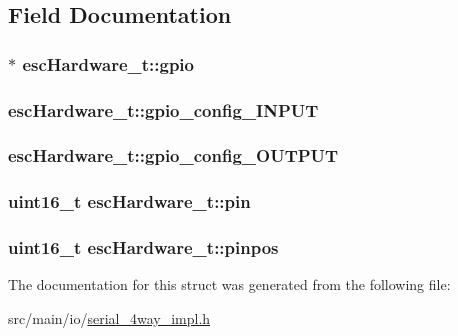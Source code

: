 \subsection{Field Documentation}
\hypertarget{structescHardware__t_af1e2d02487b679ff58901f36db0d97d9}{
\subsubsection[{gpio}]{$\ast$ esc\+Hardware\+\_\+t\+::gpio}}\label{structescHardware__t_af1e2d02487b679ff58901f36db0d97d9}
\hypertarget{structescHardware__t_a903bb73901dddb9f5730579006e74772}{
\subsubsection[{gpio\+\_\+config\+\_\+\+I\+N\+P\+U\+T}]{ esc\+Hardware\+\_\+t\+::gpio\+\_\+config\+\_\+\+I\+N\+P\+U\+T}}\label{structescHardware__t_a903bb73901dddb9f5730579006e74772}
\hypertarget{structescHardware__t_afe34748d0d5940a9b76a64cbde96a2d5}{
\subsubsection[{gpio\+\_\+config\+\_\+\+O\+U\+T\+P\+U\+T}]{ esc\+Hardware\+\_\+t\+::gpio\+\_\+config\+\_\+\+O\+U\+T\+P\+U\+T}}\label{structescHardware__t_afe34748d0d5940a9b76a64cbde96a2d5}
\hypertarget{structescHardware__t_a3858440c5b0fb003c2bdb102b6a64efd}{
\subsubsection[{pin}]{\setlength{\rightskip}{0pt plus 5cm}uint16\+\_\+t esc\+Hardware\+\_\+t\+::pin}}\label{structescHardware__t_a3858440c5b0fb003c2bdb102b6a64efd}
\hypertarget{structescHardware__t_a4b5a825fafe0a4a53b1440e427c64df2}{
\subsubsection[{pinpos}]{\setlength{\rightskip}{0pt plus 5cm}uint16\+\_\+t esc\+Hardware\+\_\+t\+::pinpos}}\label{structescHardware__t_a4b5a825fafe0a4a53b1440e427c64df2}


The documentation for this struct was generated from the following file\+:\begin{DoxyCompactItemize}
\item 
src/main/io/\hyperlink{serial__4way__impl_8h}{serial\+\_\+4way\+\_\+impl.\+h}\end{DoxyCompactItemize}
